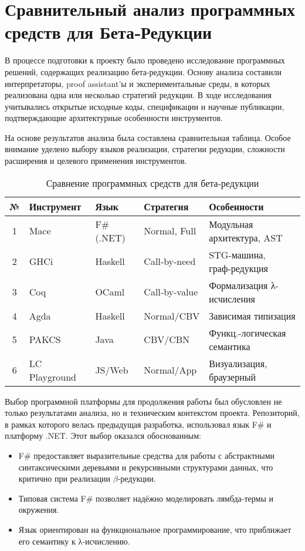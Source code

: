 \section{Сравнительный анализ программных средств для Бета‑Редукции}
\label{sec:tools-beta}


В процессе подготовки к проекту было проведено исследование программных решений, содержащих реализацию бета‑редукции. Основу анализа составили интерпретаторы, proof assistant’ы и экспериментальные среды, в которых реализована одна или несколько стратегий редукции. В ходе исследования учитывались открытые исходные коды, спецификации и научные публикации, подтверждающие архитектурные особенности инструментов.  

На основе результатов анализа была составлена сравнительная таблица. Особое внимание уделено выбору языков реализации, стратегии редукции, сложности расширения и целевого применения инструментов.

\begin{table}[h]
\caption{Сравнение программных средств для бета‑редукции}
\label{tbl:cmp-tools-beta}
\centering
\small
\begin{tabular}{|c|l|l|l|l|}
\hline
№ & Инструмент & Язык & Стратегия & Особенности \\
\hline
1 & Mace & F\# (.NET) & Normal, Full & Модульная архитектура, AST \\
2 & GHCi & Haskell & Call‑by‑need & STG‑машина, граф‑редукция \\
3 & Coq & OCaml & Call‑by‑value & Формализация λ-исчисления \\
4 & Agda & Haskell & Normal/CBV & Зависимая типизация \\
5 & PAKCS & Java & CBV/CBN & Функц.-логическая семантика \\
6 & LC Playground & JS/Web & Normal/App & Визуализация, браузерный \\
\hline
\end{tabular}
\end{table}


\medskip

\noindent
Выбор программной платформы для продолжения работы был обусловлен не только результатами анализа, но и техническим контекстом проекта. Репозиторий, в рамках которого велась предыдущая разработка, использовал язык F\# и платформу .NET. Этот выбор оказался обоснованным:

\begin{itemize}
    \item F\# предоставляет выразительные средства для работы с абстрактными синтаксическими деревьями и рекурсивными структурами данных, что критично при реализации $\beta$‑редукции.
    \item Типовая система F\# позволяет надёжно моделировать лямбда‑термы и окружения.
    \item Язык ориентирован на функциональное программирование, что приближает его семантику к λ‑исчислению.
\end{itemize}

